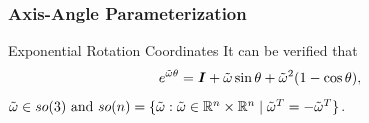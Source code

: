 %	

\begin{frame}
	\frametitle{Axis-Angle Parameterization}
	\begin{block}{Exponential Rotation Coordinates}
		It can be verified that 
		\begin{align}
			e^{ \tilde{\omega} \theta} = \bm{I} + \tilde{\omega} \sin \theta + \tilde{\omega}^2 (1 - \cos \theta),
		\end{align}
		 $ \tilde{\omega} \in so(3) \text{ and }so(n) = \{\tilde{\omega}: \tilde{\omega}\in \mathbb{R}^n \times \mathbb{R}^n \mid \tilde{\omega}^T = -\tilde{\omega}^T\}$.
	\end{block}
\end{frame}

